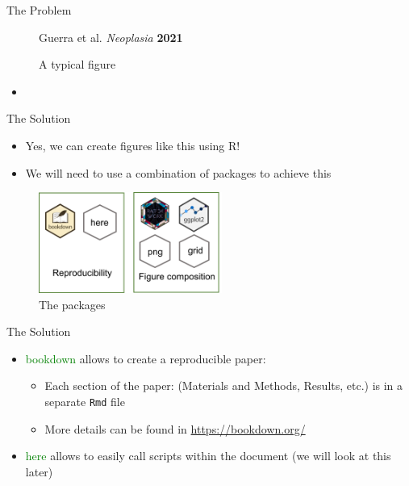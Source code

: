 \documentclass[
  ignorenonframetext,
]{beamer}
\providecommand{\tightlist}{%
  \setlength{\itemsep}{0pt}\setlength{\parskip}{0pt}}\usepackage{longtable,booktabs,array}
\begin{document}
\begin{frame}{The Problem}
\protect\hypertarget{the-problem-1}{}
\begin{figure}
\centering
\caption{A typical figure}
                {\tiny{Guerra et al.} \textit{Neoplasia} \textbf{2021}}
    \end{figure}

\begin{itemize}[<+->]
\item
  \color{red}{Can figures like this be created using `RMarkdown`?}
\end{itemize}
\end{frame}

\begin{frame}{The Solution}
\protect\hypertarget{the-solution}{}
\begin{itemize}[<+->]
\item
  Yes, we can create figures like this using R!
\item
  We will need to use a combination of packages to achieve this
\end{itemize}

\begin{figure}
\centering
\caption{The packages}
\includegraphics[width=6cm]{R_packages.png}
\end{figure}
\end{frame}

\begin{frame}[fragile]{The Solution}
\protect\hypertarget{the-solution-1}{}
\begin{itemize}[<+->]
\tightlist
\item
  \textcolor{green}{{bookdown}} allows to create a reproducible paper:

  \begin{itemize}[<+->]
  \tightlist
  \item
    Each section of the paper: (Materials and Methods, Results, etc.) is
    in a separate \texttt{Rmd} file
  \item
    More details can be found in \url{https://bookdown.org/}
  \end{itemize}
\item
  \textcolor{green}{{here}} allows to easily call scripts within the
  document (we will look at this later)
\end{itemize}
\end{frame}
\end{document}
